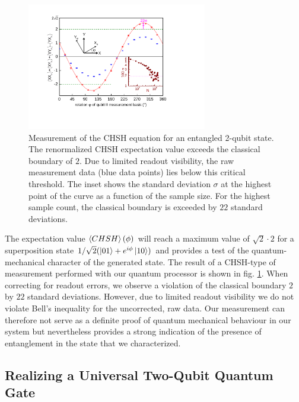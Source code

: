 \begin{figure}[ht!]
	\centering
		\includegraphics[width=0.7\textwidth]{./material/papers/iswap/submission1/Dewes_Figure3}
	\caption[Measurement of the CHSH operator of an entanged 2-qubit state]{Measurement of the CHSH equation for an entangled 2-qubit state. The renormalized CHSH expectation value exceeds the classical boundary of $2$. Due to limited readout visibility, the raw measurement data (blue data points) lies below this critical threshold. The inset shows the standard deviation $\sigma$ at the highest point of the curve as a function of the sample size. For the highest sample count, the classical boundary is exceeded by $22$ standard deviations.}
	\label{fig:chsh_measurement}
\end{figure}

The expectation value $\left< CHSH \right>(\phi)$ will reach a maximum value of $\sqrt{2}\cdot 2$ for a superposition state $1/\sqrt{2}(\left| 01 \right>+e^{i\phi}\left| 10 \right>)$ and provides a test of the quantum-mechanical character of the generated state. The result of a CHSH-type of measurement performed with our quantum processor is shown in fig. \ref{fig:chsh_measurement}. When correcting for readout errors, we observe a violation of the classical boundary $2$ by $22$ standard deviations. However, due to limited readout visibility we do not violate Bell's inequality for the uncorrected, raw data. Our measurement can therefore not serve as a definite proof of quantum mechanical behaviour in our system but nevertheless provides a strong indication of the presence of entanglement in the state that we characterized.

\subsection{Realizing a Universal Two-Qubit Quantum Gate}

